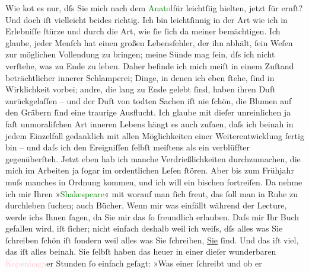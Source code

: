            \pstart
           Wie ko{\geminationm}t es nur, dſs Sie mich nach dem \textcolor{green}{Anatol}{}\ledrightnote{\textcolor{green}{Anatol}}{ }{\pb}für leichtſi{\geminationn}ig
               hielten, jetzt für ernſt? Und doch iſt vielleicht beides richtig. Ich bin
               leichtſinnig in der Art wie ich in Erlebniſſe ſtürze un\textcolor{gray}{d}{ }\label{T_L00643_1v}\label{T_L00643_1h} durch
               die Art, wie ſie ſich da{\geminationn} meiner bemächtigen. Ich
               glaube, jeder Menſch hat einen großen Lebensfehler, der ihn abhält, ſein Weſen zur
               möglichen Vollendung zu bringen; meine Sünde mag ſein, dſs ich nicht verſtehe, was zu
               Ende zu leben. Daher befinde ich mich meiſt in einem Zuſtand beträchtlicher innerer
               Schlamperei; Dinge, in denen ich eben ſtehe, ſind in Wirklichkeit {\pb}vorbei; andre, die lang zu Ende gelebt ſind, haben
               ihren Duft zurückgelaſſen – und der Duft von todten Sachen iſt nie ſchön, die Blumen
               auf den Gräbern ſind eine traurige Ausflucht. Ich glaube mit dieſer unreinlichen ja
               faſt unmoraliſchen Art inneren Lebens hängt es auch zuſa\textcolor{gray}{{\geminationm}}en, daſs ich beinah in jedem Einzelfall gedanklich mit allen Möglichkeiten
               einer Weiterentwicklung fertig bin – und daſs ich den Ereigniſſen ſelbſt meiſtens als
               ein verblüffter gegenüberſteh.\pend
           \pstart
           {\pb}Jetzt eben hab ich manche Verdrießlichkeiten
               durchzumachen, die mich im Arbeiten ja ſogar im ordentlichen Leſen ſtören. Aber bis
               zum Frühjahr muſs manches in Ordnung kommen, und ich will ein bischen fortreiſen. Da
               nehme ich mir Ihren »\textcolor{green}{Shakespeare}{}\ledrightnote{\textcolor{green}{William Shakespeare}}« mit worauf man
               ſich freut, das ſoll man in Ruhe zu durchleben ſuchen; auch Bücher. Wenn mir was
               einfällt während der Lecture, werde ichs Ihnen ſagen, da Sie mir das ſo freundlich
               erlauben. Daſs {\pb}mir Ihr Buch gefallen wird, iſt
               ſicher; nicht einfach deshalb weil ich weiſs, dſs alles was Sie ſchreiben ſchön iſt
               ſondern weil alles was Sie ſchreiben, \uline{Sie}{ }ſind. Und das iſt viel, das iſt alles beinah. Sie
               ſelbſt haben das heuer in einer dieſer wunderbaren \textcolor{pink}{Kopenhagn}{}\ledrightnote{\textcolor{pink}{Kopenhagen}}er Stunden ſo einfach geſagt: »Was einer ſchreibt und ob er
